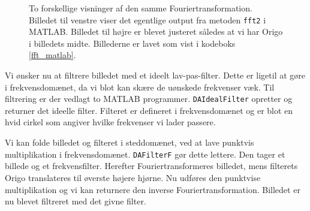 \documentclass[a4paper, 10pt, danish, final]{article}
\begin{document}
\begin{figure}[!h]
    \centering
    \caption[]{To forskellige visninger af den samme
    Fouriertransformation. Billedet til venstre viser det egentlige
    output fra metoden \texttt{fft2} i MATLAB. Billedet til højre er
    blevet justeret således at vi har Origo i billedets midte.
    Billederne er lavet som vist i kodeboks \ref{fft_matlab}.}
    \label{ffts}
\end{figure}

Vi ønsker nu at filtrere billedet med et ideelt lav-pas-filter. Dette er
ligetil at gøre i frekvensdomænet, da vi blot kan skære de uønskede
frekvenser væk. Til filtrering er der vedlagt to MATLAB programmer.
\texttt{DAIdealFilter} opretter og returner det ideelle filter. Filteret
er defineret i frekvensdomænet og er blot en hvid cirkel som angiver
hvilke frekvenser vi lader passere.

Vi kan folde billedet og filteret i steddomænet, ved at lave punktvis
multiplikation i frekvensdomænet. \texttt{DAFilterF} gør dette lettere.
Den tager et billede og et frekvensfilter. Herefter Fouriertransformeres
billedet, mens filterets Origo translateres til øverste højere hjørne.
Nu udføres den punktvise multiplikation og vi kan returnere den inverse
Fouriertransformation. Billedet er nu blevet filtreret med det givne
filter.
\end{document}
